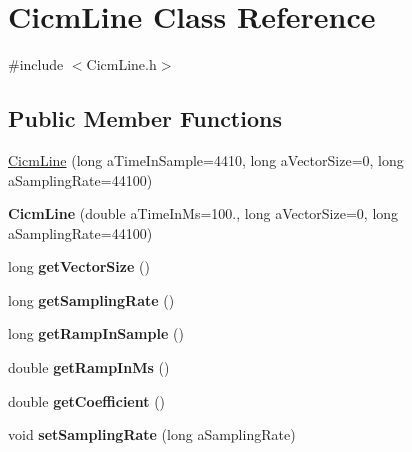 \hypertarget{class_cicm_line}{\section{Cicm\-Line Class Reference}
\label{class_cicm_line}
}


{\ttfamily \#include $<$Cicm\-Line.\-h$>$}

\subsection*{Public Member Functions}
\begin{DoxyCompactItemize}
\item 
\hyperlink{class_cicm_line_a1e4c4c8a02a5b964af98e8034ca722ec}{Cicm\-Line} (long a\-Time\-In\-Sample=4410, long a\-Vector\-Size=0, long a\-Sampling\-Rate=44100)
\item 
\hypertarget{class_cicm_line_aaf8fafba2b436da502ffd90c11803043}{{\bfseries Cicm\-Line} (double a\-Time\-In\-Ms=100., long a\-Vector\-Size=0, long a\-Sampling\-Rate=44100)}\label{class_cicm_line_aaf8fafba2b436da502ffd90c11803043}

\item 
\hypertarget{class_cicm_line_ae930ff600e396194535344b404bde04d}{long {\bfseries get\-Vector\-Size} ()}\label{class_cicm_line_ae930ff600e396194535344b404bde04d}

\item 
\hypertarget{class_cicm_line_a1333edda51022435eb0b766c4fa683ed}{long {\bfseries get\-Sampling\-Rate} ()}\label{class_cicm_line_a1333edda51022435eb0b766c4fa683ed}

\item 
\hypertarget{class_cicm_line_a80906ed66c29493501e3c9f263109430}{long {\bfseries get\-Ramp\-In\-Sample} ()}\label{class_cicm_line_a80906ed66c29493501e3c9f263109430}

\item 
\hypertarget{class_cicm_line_ab5debf1f919532f78fc8f08376b4ae06}{double {\bfseries get\-Ramp\-In\-Ms} ()}\label{class_cicm_line_ab5debf1f919532f78fc8f08376b4ae06}

\item 
\hypertarget{class_cicm_line_a4f489a8a7f208ea08d029eece29eea4d}{double {\bfseries get\-Coefficient} ()}\label{class_cicm_line_a4f489a8a7f208ea08d029eece29eea4d}

\item 
\hypertarget{class_cicm_line_a04ac8461b3a011bfa3cfb15343677566}{void {\bfseries set\-Sampling\-Rate} (long a\-Sampling\-Rate)}\label{class_cicm_line_a04ac8461b3a011bfa3cfb15343677566}


\end{DoxyCompactItemize}
